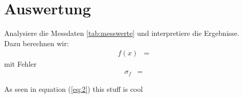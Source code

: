 \section{Auswertung}
Analysiere die Messdaten \ref{tab:messwerte} und interpretiere die Ergebnisse. \\
Dazu berechnen wir:
\begin{align}
    f(x) &=  
    \tag{123}
    \label{eq:2}
\end{align}
mit Fehler
\begin{align}
    \sigma_f &= 
\end{align}

As seen in equation (\ref{eq:2}) this stuff is cool